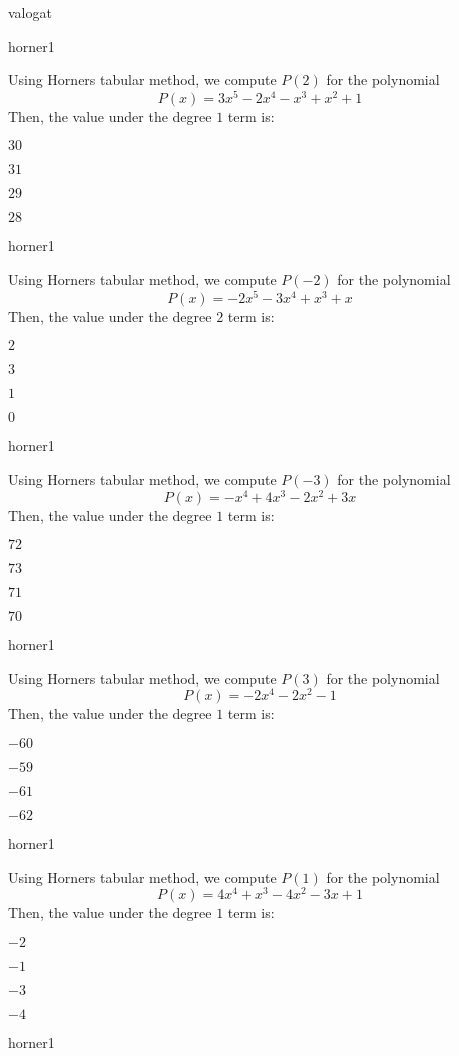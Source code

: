 \documentclass[12pt]{article}
\begin{document}
\begin{quiz}{valogat}
\begin{multi}{horner1}

Using Horners tabular method, we compute $P(2)$ for the polynomial
$$P(x)=3x^5-2x^4-x^3+x^2+1$$
Then, the value under the degree $1$ term is:
\item* $ 30 $
\item  $ 31 $
\item  $ 29 $
\item  $ 28 $
\end{multi}
\begin{multi}{horner1}

Using Horners tabular method, we compute $P(-2)$ for the polynomial
$$P(x)=-2x^5-3x^4+x^3+x$$
Then, the value under the degree $2$ term is:
\item* $ 2 $
\item  $ 3 $
\item  $ 1 $
\item  $ 0 $
\end{multi}
\begin{multi}{horner1}

Using Horners tabular method, we compute $P(-3)$ for the polynomial
$$P(x)=-x^4+4x^3-2x^2+3x$$
Then, the value under the degree $1$ term is:
\item* $ 72 $
\item  $ 73 $
\item  $ 71 $
\item  $ 70 $
\end{multi}
\begin{multi}{horner1}

Using Horners tabular method, we compute $P(3)$ for the polynomial
$$P(x)=-2x^4-2x^2-1$$
Then, the value under the degree $1$ term is:
\item* $ -60 $
\item  $ -59 $
\item  $ -61 $
\item  $ -62 $
\end{multi}
\begin{multi}{horner1}

Using Horners tabular method, we compute $P(1)$ for the polynomial
$$P(x)=4x^4+x^3-4x^2-3x+1$$
Then, the value under the degree $1$ term is:
\item* $ -2 $
\item  $ -1 $
\item  $ -3 $
\item  $ -4 $
\end{multi}
\begin{multi}{horner1}


\end{multi}
\end{quiz}
\end{document}
